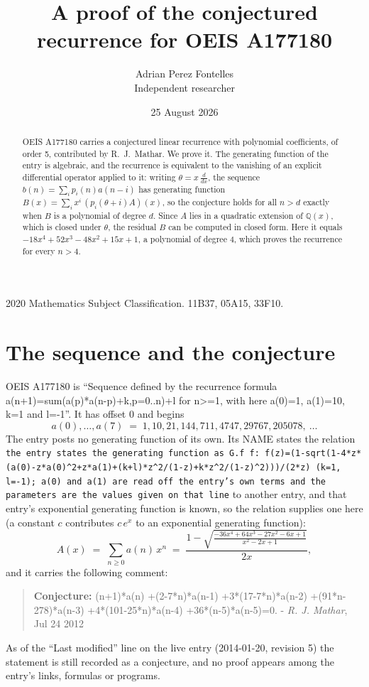 \documentclass[11pt,a4paper]{article}
\title{A proof of the conjectured recurrence for OEIS A177180}
\author{Adrian Perez Fontelles\\ \small Independent researcher}
\date{25 August 2026}
\theoremstyle{plain}
\theoremstyle{definition}
\begin{document}
\maketitle

\begin{abstract}
OEIS A177180 carries a conjectured linear recurrence with polynomial coefficients, of
order 5, contributed by R.~J.~Mathar. We prove it. The generating function of the
entry is algebraic, and the recurrence is equivalent to the vanishing of an explicit
differential operator applied to it: writing $\theta=x\,\frac{d}{dx}$, the sequence
$b(n)=\sum_{i}p_{i}(n)a(n-i)$ has generating function
$B(x)=\sum_{i}x^{i}\,(p_{i}(\theta+i)A)(x)$, so the conjecture holds for all $n>d$ exactly
when $B$ is a polynomial of degree $d$. Since $A$ lies in a quadratic extension of
$\mathbb{Q}(x)$, which is closed under $\theta$, the residual $B$ can be computed in
closed form. Here it equals $- 18 x^{4} + 52 x^{3} - 48 x^{2} + 15 x + 1$, a polynomial of degree $4$, which proves
the recurrence for every $n>4$.
\end{abstract}

\noindent\small 2020 Mathematics Subject Classification. 11B37, 05A15, 33F10.\normalsize

\section{The sequence and the conjecture}

OEIS A177180 is ``Sequence defined by the recurrence formula a(n+1)=sum(a(p)*a(n-p)+k,p=0..n)+l for n>=1, with here a(0)=1, a(1)=10, k=1 and l=-1''. It has offset $0$ and begins
\[
a(0),\dots,a(7)\;=\;1, 10, 21, 144, 711, 4747, 29767, 205078,\ \dots
\]
The entry posts no generating function of its own. Its NAME states the
relation \texttt{the entry states the generating function as G.f f: f(z)=(1-sqrt(1-4*z*(a(0)-z*a(0)\textasciicircum{}2+z*a(1)+(k+l)*z\textasciicircum{}2/(1-z)+k*z\textasciicircum{}2/(1-z)\textasciicircum{}2)))/(2*z) (k=1, l=-1); a(0) and a(1) are read off the entry's own terms and the parameters are the values given on that line} to another entry, and that entry's exponential generating
function is known, so the relation supplies one here (a constant $c$ contributes
$c\,e^{x}$ to an exponential generating function):
\begin{equation}\label{eq:gf}
A(x)\;=\;\sum_{n\ge 0} a(n)\,x^{n}\;=\;\frac{1 - \sqrt{\frac{- 36 x^{4} + 64 x^{3} - 27 x^{2} - 6 x + 1}{x^{2} - 2 x + 1}}}{2 x} ,
\end{equation}
and it carries the following comment:
\begin{quote}\small
\textbf{Conjecture:} (n+1)*a(n) +(2-7*n)*a(n-1) +3*(17-7*n)*a(n-2) +(91*n-278)*a(n-3) +4*(101-25*n)*a(n-4) +36*(n-5)*a(n-5)=0. - \emph{R. J. Mathar}, Jul 24 2012
\end{quote}
As of the ``Last modified'' line on the live entry (2014-01-20, revision 5) the
statement is still recorded as a conjecture, and no proof appears among the entry's links,
formulas or programs.
\end{document}
